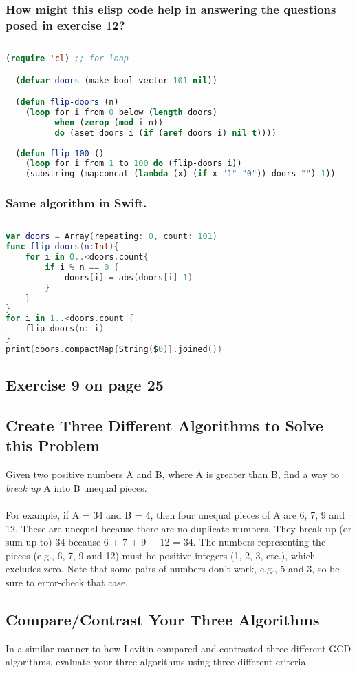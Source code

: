 \documentclass[12pt]{amsart}
\begin{document}
\subsubsection{How might this elisp code help in answering the questions posed in exercise 12?}$ $ 
\begin{lstlisting}[language=lisp, frame=single] 
(require 'cl) ;; for loop

  (defvar doors (make-bool-vector 101 nil))

  (defun flip-doors (n)
    (loop for i from 0 below (length doors)
          when (zerop (mod i n))
          do (aset doors i (if (aref doors i) nil t))))
 
  (defun flip-100 ()
    (loop for i from 1 to 100 do (flip-doors i))
    (substring (mapconcat (lambda (x) (if x "1" "0")) doors "") 1))
\end{lstlisting}
\pagebreak
\subsubsection{Same algorithm in Swift.}$ $

\begin{lstlisting}[language=Swift, frame=single]
var doors = Array(repeating: 0, count: 101)
func flip_doors(n:Int){
    for i in 0..<doors.count{
        if i % n == 0 {
            doors[i] = abs(doors[i]-1)
        }
    }
}
for i in 1..<doors.count {
    flip_doors(n: i)
}
print(doors.compactMap{String($0)}.joined())
\end{lstlisting}

\subsection{Exercise 9 on page 25} 
\subsection{Create Three Different Algorithms to Solve this Problem}
Given two positive numbers A and B, where A is greater than B, find a way to \textit{break up} A into B unequal pieces.\\\\For example, if A = 34 and B = 4, then four unequal pieces of A are 6, 7, 9 and 12. These are unequal because there are no duplicate numbers. They break up (or sum up to) 34 because 6 + 7 + 9 + 12 = 34. The numbers representing the pieces (e.g., 6, 7, 9 and 12) must be positive integers (1, 2, 3, etc.), which excludes zero. Note that some pairs of numbers don't work, e.g., 5 and 3, so be sure to error-check that case.

\subsection{Compare/Contrast Your Three Algorithms}
In a similar manner to how Levitin compared and contrasted three different GCD algorithms, evaluate your three algorithms using three different criteria.
\end{document}
